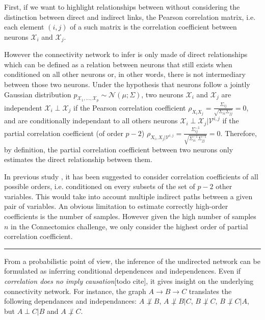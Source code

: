 \documentclass[wcp]{jmlr}
\begin{document}
 First, if we want to highlight
relationships between without considering the distinction between direct and
indirect links, the Pearson correlation matrix, i.e. each element $(i,j)$ of a
such matrix is the correlation coefficient between neurons $\mathcal{X}_i$ and $\mathcal{X}_j$.

However the connectivity network to infer is only made of direct relationships
which can be defined as a relation between neurons that still exists when
conditioned on all other neurons or, in other words, there is not intermediary
between those two neurons.  Under the hypothesis that neurons follow a jointly
Gaussian distribution $p_{\mathcal{X}_1, \dots, \mathcal{X}_p} \sim
\mathcal{N}(\mu; \Sigma)$, two neurons $\mathcal{X}_i$ and $\mathcal{X}_j$ are
independent $\mathcal{X}_i\perp \mathcal{X}_j$ if the Pearson correlation
coefficient $\rho_{X_iX_j} = \frac{\Sigma_{ij}}{\sqrt{\Sigma_{ii}
\Sigma_{jj}}} = 0,$ and are conditionally independant to all others neurons
$\mathcal{X}_i \perp \mathcal{X}_j |\mathcal{V}^{i,j}$ if the partial
correlation coefficient (of order $p-2$) $\rho_{X_i, X_j | \mathcal{V}^{i,j}}
= \frac{\Sigma^{-1}_{ij}}{\sqrt{\Sigma^{-1}_{ii} \Sigma^{-1}_{jj}}} = 0.$
Therefore, by definition, the partial correlation coefficient between two
neurons only estimates the direct relationship between them.

In previous study \cite{shipley2002cause}, it has been suggested to
consider correlation coefficients of all possible orders,
i.e. conditioned on every subsets of the set of $p-2$ other variables. This
would take into account multiple indirect paths between a given pair of
variables. An obvious limitation to estimate correctly high-order coefficients
is the number of samples. However given the high number of samples $n$
in the Connectomics challenge, we only consider the highest order of partial
correlation coefficient.

\vspace{1em}
\hrule
\vspace{1em}


From a probabilistic point of view, the inference of the undirected network
can be formulated as inferring conditional dependences and
independences.  Even if \textit{correlation
does no imply causation}[todo cite], it gives insight on the underlying connectivity
network. For instance, the graph $A \rightarrow B \rightarrow C$ translates the
following dependances and independances: $A \not\perp B$, $A \not\perp B | C$,
$B \not\perp C$, $B \not\perp C | A$, but $A \perp C | B$ and  $A \not\perp C$.
\end{document}
